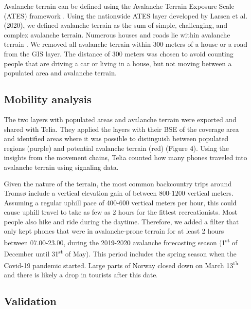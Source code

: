\documentclass[authordate,empirical, issue]{jote-new-article}
\begin{document}
Avalanche terrain can be defined using the Avalanche Terrain Exposure Scale (ATES) framework \parencites{Statham2006}. Using the nationwide ATES layer developed by Larsen et al.(2020), we defined avalanche terrain as the sum of simple, challenging, and complex avalanche terrain. Numerous houses and roads lie within avalanche terrain \parencites{Kalsnes2021}. We removed all avalanche terrain within 300 meters of a house or a road from the GIS layer. The distance of 300 meters was chosen to avoid counting people that are driving a car or living in a house, but not moving between a populated area and avalanche terrain.







\subsection{Mobility analysis}



The two layers with populated areas and avalanche terrain were exported and shared with Telia. They applied the layers with their BSE of the coverage area and identified areas where it was possible to distinguish between populated regions (purple) and potential avalanche terrain (red) (Figure 4). Using the insights from the movement chains, Telia counted how many phones traveled into avalanche terrain using signaling data.







Given the nature of the terrain, the most common backcountry trips around Tromsø include a vertical elevation gain of between 800-1200 vertical meters. Assuming a regular uphill pace of 400-600 vertical meters per hour, this could cause uphill travel to take as few as 2 hours for the fittest recreationists. Most people also hike and ride during the daytime. Therefore, we added a filter that only kept phones that were in avalanche-prone terrain for at least 2 hours between 07.00-23.00, during the 2019-2020 avalanche forecasting season (1\textsuperscript{st} of December until 31\textsuperscript{st} of May). This period includes the spring season when the Covid-19 pandemic started. Large parts of Norway closed down on March 13\textsuperscript{th} and there is likely a drop in tourists after this date.






\subsection{Validation}
\end{document}
